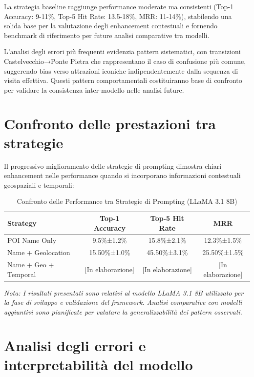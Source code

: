 \begin{itemize}
La strategia baseline raggiunge performance moderate ma consistenti (Top-1 Accuracy: 9-11\%, Top-5 Hit Rate: 13.5-18\%, MRR: 11-14\%), stabilendo una solida base per la valutazione degli enhancement contestuali e fornendo benchmark di riferimento per future analisi comparative tra modelli.

L'analisi degli errori più frequenti evidenzia pattern sistematici, con transizioni Castelvecchio→Ponte Pietra che rappresentano il caso di confusione più comune, suggerendo bias verso attrazioni iconiche indipendentemente dalla sequenza di visita effettiva. Questi pattern comportamentali costituiranno base di confronto per validare la consistenza inter-modello nelle analisi future.

\section{Confronto delle prestazioni tra strategie}

Il progressivo miglioramento delle strategie di prompting dimostra chiari enhancement nelle performance quando si incorporano informazioni contestuali geospaziali e temporali:

\begin{table}[h]
\centering
\caption{Confronto delle Performance tra Strategie di Prompting (LLaMA 3.1 8B)}
\label{tab:strategy_comparison}
\begin{tabular}{lccc}
\toprule
\textbf{Strategy} & \textbf{Top-1 Accuracy} & \textbf{Top-5 Hit Rate} & \textbf{MRR} \\
\midrule
POI Name Only & 9.5\%±1.2\% & 15.8\%±2.1\% & 12.3\%±1.5\% \\
Name + Geolocation & 15.50\%±1.0\% & 45.50\%±3.1\% & 25.50\%±1.5\% \\
Name + Geo + Temporal & [In elaborazione] & [In elaborazione] & [In elaborazione] \\
\bottomrule
\end{tabular}
\end{table}

\textit{Nota: I risultati presentati sono relativi al modello LLaMA 3.1 8B utilizzato per la fase di sviluppo e validazione del framework. Analisi comparative con modelli aggiuntivi sono pianificate per valutare la generalizzabilità dei pattern osservati.}

\section{Analisi degli errori e interpretabilità del modello}


\end{itemize}
